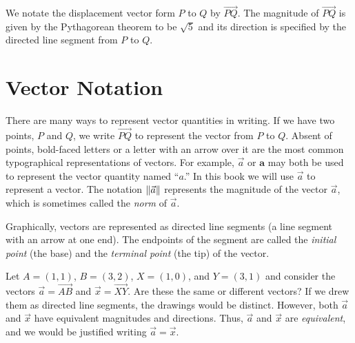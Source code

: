 We notate the displacement vector form $P$ to $Q$ by $\overrightarrow{PQ}$.
The magnitude of $\overrightarrow{PQ}$ is given by the Pythagorean theorem
to be $\sqrt{5}$ and its direction is specified by the directed line segment from
$P$ to $Q$.


\section{Vector Notation}
There are many ways to represent vector quantities in writing.  If
we have two points, $P$ and $Q$, we write $\overrightarrow{PQ}$ to represent the
vector from $P$ to $Q$.  Absent of points, bold-faced letters or a letter
with an arrow over it are the most common typographical representations of vectors.
For example, $\vec a$ or $\mathbf{a}$ may both be used to represent the vector
quantity named ``$a$.''  In this book we will use $\vec a$ to represent a vector.
The notation $\lVert\vec a\rVert$\index{$\norm{\:\cdot\:}$}
represents the magnitude of the vector $\vec a$, which is sometimes called
the \emph{norm} of $\vec a$.

Graphically, vectors are represented as directed line segments (a
line segment with an arrow at one end).  The endpoints of the segment are called the 
\emph{initial
point} (the base) and the \emph{terminal point} (the tip) of the vector.

\begin{center}
	\usetikzlibrary{patterns,decorations.pathreplacing}
\end{center}

Let $A=(1,1)$, $B=(3,2)$, $X=(1,0)$, and $Y=(3,1)$ and consider the vectors
$\vec a = \overrightarrow{AB}$ and $\vec x=\overrightarrow{XY}$.  Are these
the same or different vectors?  If we drew them as directed line segments,
the drawings would be distinct.  However, both $\vec a$ and $\vec x$ have equivalent
magnitudes and directions.  Thus, $\vec a$ and $\vec x$ are \emph{equivalent},
and we would be justified writing $\vec a=\vec x$.

